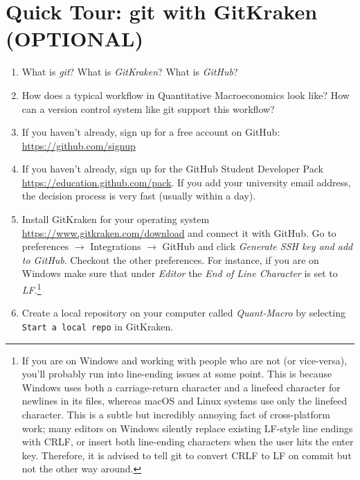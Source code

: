 \section[Quick Tour: git with GitKraken]{Quick Tour: git with GitKraken (OPTIONAL)\label{ex:QuickTourGitWithGitKraken}}

\begin{enumerate}

\item
What is \emph{git}? What is \emph{GitKraken}? What is \emph{GitHub}?

\item
How does a typical workflow in Quantitative Macroeconomics look like?
How can a version control system like git support this workflow?

\item
If you haven't already, sign up for a free account on GitHub: \url{https://github.com/signup}

\item
If you haven't already, sign up for the GitHub Student Developer Pack \url{https://education.github.com/pack}.
If you add your university email address, the decision process is very fast (usually within a day).

\item
Install GitKraken for your operating system \url{https://www.gitkraken.com/download} and connect it with GitHub.
Go to preferences \(\rightarrow \) Integrations \(\rightarrow \) GitHub and click \emph{Generate SSH key and add to GitHub}.
Checkout the other preferences.
For instance, if you are on Windows make sure that under \emph{Editor} the \emph{End of Line Character} is set to \emph{LF}.\footnote{%
  If you are on Windows and working with people who are not (or vice-versa),
    you'll probably run into line-ending issues at some point.
  This is because Windows uses both a carriage-return character and a linefeed character for newlines in its files,
    whereas macOS and Linux systems use only the linefeed character.
  This is a subtle but incredibly annoying fact of cross-platform work;
    many editors on Windows silently replace existing LF-style line endings with CRLF,
    or insert both line-ending characters when the user hits the enter key.
  Therefore, it is advised to tell git to convert CRLF to LF on commit but not the other way around.
}

\item
Create a local repository on your computer called \emph{Quant-Macro} by selecting \texttt{Start a local repo} in GitKraken.


\end{enumerate}
